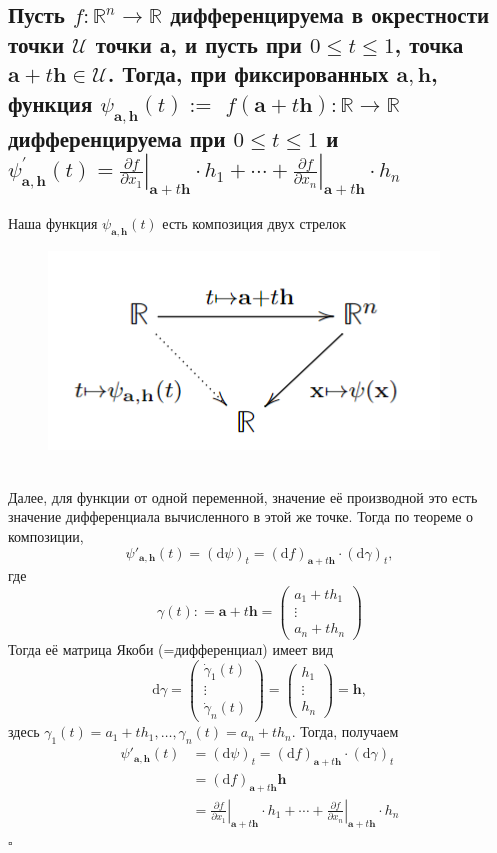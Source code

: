 \documentclass[a4paper]{article}
\newcommand{\qed}{\hfill$\square$}
\newcommand{\m}[1]{\mathbf{#1}}
\begin{document}
\subsection{Пусть $f: \mathbb{R}^{n} \rightarrow \mathbb{R}$ дифференцируема в окрестности точки $\mathscr{U}$ точки а, и пусть при $0 \leq t \leq 1$, точка $\mathbf{a}+t \mathbf{h} \in \mathscr{U}$. Тогда, при фиксированных $\mathbf{a}, \mathbf{h}$, функция $\psi_{\mathbf{a}, \mathbf{h}}(t):=$ $f(\mathbf{a}+t \mathbf{h}): \mathbb{R} \rightarrow \mathbb{R}$ дифференцируема при $0 \leq t \leq 1$ и
$
\psi_{\mathbf{a}, \mathbf{h}}^{\prime}(t)=\left.\frac{\partial f}{\partial x_{1}}\right|_{\mathbf{a}+t \mathbf{h}} \cdot h_{1}+\cdots+\left.\frac{\partial f}{\partial x_{n}}\right|_{\mathbf{a}+t \mathbf{h}} \cdot h_{n}
$}
Наша функция $\psi_{\m{a},\m{h}}(t)$ есть композиция двух стрелок
\begin{figure}[h]
    \centering
    \includegraphics[width=0.3\linewidth]{image-1.png}
\end{figure}\\
Далее, для функции от одной переменной, значение её производной это есть значение дифференциала вычисленного в этой же точке. Тогда по теореме о композиции,
$$
\psi'_{\m{a},\m{h}}(t) = (\mathrm{d}\psi)_t = (\mathrm{d}f)_{\m{a}+t\m{h}} \cdot (\mathrm{d}\gamma)_t,
$$
где 
$$
\gamma(t): = \m{a}+t\m{h} = \begin{pmatrix}
a_1 + th_1 \\ \vdots \\ a_n + t h_n
\end{pmatrix}
$$
Тогда её матрица Якоби (=дифференциал) имеет вид
$$
\mathrm{d}\gamma = \begin{pmatrix}
\dot\gamma_1(t) \\ \vdots \\ \dot \gamma_n(t)
\end{pmatrix} = \begin{pmatrix}
h_1 \\ \vdots\\ h_n
\end{pmatrix} = \m{h},
$$
здесь $\gamma_1(t) = a_1 + th_1,\ldots, \gamma_n(t) = a_n+th_n.$
Тогда, получаем
$$\begin{aligned}
\psi'_{\m{a},\m{h}}(t) & = (\mathrm{d}\psi)_t = (\mathrm{d}f)_{\m{a}+t\m{h}} \cdot (\mathrm{d}\gamma)_t \\
&= (\mathrm{d}f)_{\m{a}+t\m{h}} \m{h} \\
&= \left.\frac{\partial f}{ \partial x_1}\right|_{\m{a} + t \m{h}} \cdot h_1 + \cdots + \left.\frac{\partial f}{ \partial x_n}\right|_{\m{a} + t \m{h}} \cdot h_n
\end{aligned}$$\qed
\end{document}
